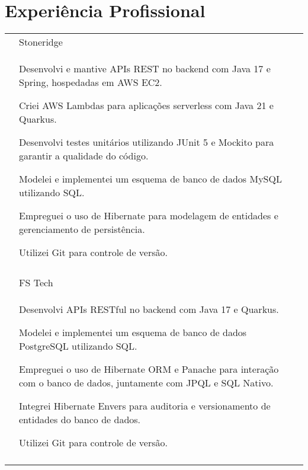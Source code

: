 \documentclass[a4paper,12pt]{article}
\newcommand{\preheadingspacing}{\vspace{6pt}}
\newcommand{\postheadingspacing}{\vspace{6pt}}
\begin{document}
\preheadingspacing
\section{Experiência Profissional}
\postheadingspacing
\begin{longtable}{r|p{14.1cm}}

& \large{Stoneridge} \\*
&\small{
    \begin{itemize*}[label=\Large\textbullet]
        \item \mbox{Desenvolvi} e mantive APIs REST no backend com Java 17 e Spring, hospedadas em AWS EC2.
        \item \mbox{Criei} AWS Lambdas para aplicações serverless com Java 21 e Quarkus.
        \item \mbox{Desenvolvi} testes unitários utilizando JUnit 5 e Mockito para garantir a qualidade do código.
        \item \mbox{Modelei} e implementei um esquema de banco de dados MySQL utilizando SQL.
        \item \mbox{Empreguei} o uso de Hibernate para modelagem de entidades e gerenciamento de persistência.
        \item \mbox{Utilizei} Git para controle de versão.
    \end{itemize*}
}
\\ \\

& \large{FS Tech} \\*
&\small{
    \begin{itemize*}[label=\Large\textbullet]
        \item \mbox{Desenvolvi} APIs RESTful no backend com Java 17 e Quarkus.
        \item \mbox{Modelei} e implementei um esquema de banco de dados PostgreSQL utilizando SQL.
        \item \mbox{Empreguei} o uso de Hibernate ORM e Panache para interação com o banco de dados, juntamente com JPQL e SQL Nativo.
        \item \mbox{Integrei} Hibernate Envers para auditoria e versionamento de entidades do banco de dados.
        \item \mbox{Utilizei} Git para controle de versão.
    \end{itemize*}
}
\\ \\


\end{longtable}
\end{document}
